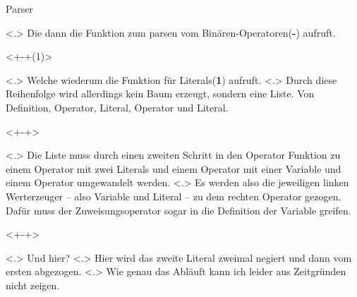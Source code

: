 \begin{frame}{Parser}
\begin{itemize}[<+- | alert@+>]
\begin{uncoverenv}
          \end{uncoverenv}
              \note[item]<.>{
                Die dann die Funktion zum parsen vom Binären-Operatoren(\textbf{-}) aufruft.
              }
          \begin{uncoverenv}<+-+(1)>%
          \end{uncoverenv}
              \note[item]<.>{
                Welche wiederum die Funktion für Literals(\textbf{1}) aufruft.
              }
              \note[item]<.>{
                Durch diese Reihenfolge wird allerdings kein Baum erzeugt, sondern eine Liste. Von Definition, Operator, Literal, Operator und Literal.
              }
          \begin{uncoverenv}<+-+>%
          \end{uncoverenv}
              \note[item]<.>{
                Die Liste muss durch einen zweiten Schritt in den Operator Funktion zu einem Operator mit zwei Literals und einem Operator mit einer Variable und einem Operator umgewandelt werden.
              }
              \note[item]<.>{
                Es werden also die jeweiligen linken Werterzeuger -- also Variable und Literal -- zu dem rechten Operator gezogen. Dafür muss der Zuweisungsoperator sogar in die Definition der Variable greifen.
              }

          \begin{uncoverenv}<+-+>%
          \end{uncoverenv}
            \note[item]<.>{
              Und hier?
            }
            \note[item]<.>{
              Hier wird das zweite Literal zweimal negiert und dann vom ersten abgezogen.
            }
            \note[item]<.>{
              Wie genau das Abläuft kann ich leider aus Zeitgründen nicht zeigen.
            }
    \end{itemize}
  \end{frame}

